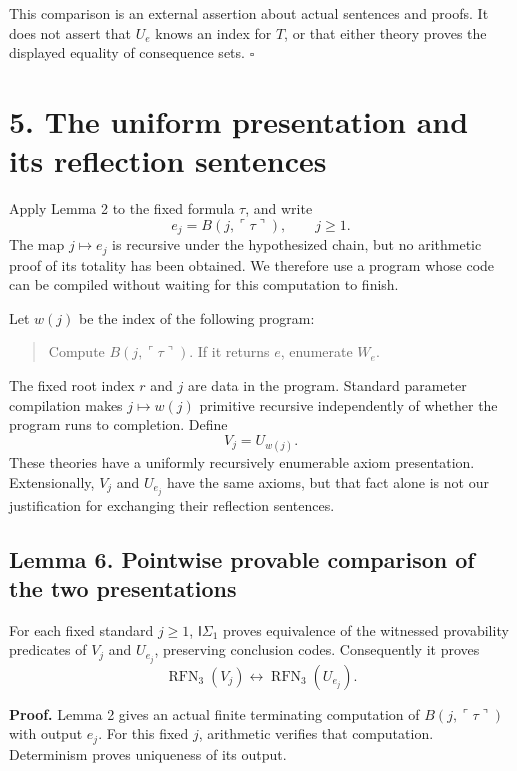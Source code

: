\documentclass[
  11pt,
  letterpaper,
]{article}
\begin{document}
This comparison is an external assertion about actual sentences and
proofs. It does not assert that \(U_e\) knows an index for \(T\), or
that either theory proves the displayed equality of consequence sets.
\hfill\(\square\)

\section{5. The uniform presentation and its reflection
sentences}\label{the-uniform-presentation-and-its-reflection-sentences}

Apply Lemma 2 to the fixed formula \(\tau\), and write \[
e_j=B(j,\ulcorner\tau\urcorner),\qquad j\geq1.
\tag{21}
\] The map \(j\mapsto e_j\) is recursive under the hypothesized chain,
but no arithmetic proof of its totality has been obtained. We therefore
use a program whose code can be compiled without waiting for this
computation to finish.

Let \(w(j)\) be the index of the following program:

\begin{quote}
Compute \(B(j,\ulcorner\tau\urcorner)\). If it returns \(e\), enumerate
\(W_e\).
\end{quote}

The fixed root index \(r\) and \(j\) are data in the program. Standard
parameter compilation makes \(j\mapsto w(j)\) primitive recursive
independently of whether the program runs to completion. Define \[
V_j=U_{w(j)}.
\tag{22}
\] These theories have a uniformly recursively enumerable axiom
presentation. Extensionally, \(V_j\) and \(U_{e_j}\) have the same
axioms, but that fact alone is not our justification for exchanging
their reflection sentences.

\subsection{Lemma 6. Pointwise provable comparison of the two
presentations}\label{lemma-6.-pointwise-provable-comparison-of-the-two-presentations}

For each fixed standard \(j\geq1\), \(\mathsf I\Sigma_1\) proves
equivalence of the witnessed provability predicates of \(V_j\) and
\(U_{e_j}\), preserving conclusion codes. Consequently it proves \[
\operatorname{RFN}_3(V_j)
\leftrightarrow\operatorname{RFN}_3(U_{e_j}).
\tag{23}
\]

\textbf{Proof.} Lemma 2 gives an actual finite terminating computation
of \(B(j,\ulcorner\tau\urcorner)\) with output \(e_j\). For this fixed
\(j\), arithmetic verifies that computation. Determinism proves
uniqueness of its output.
\end{document}
